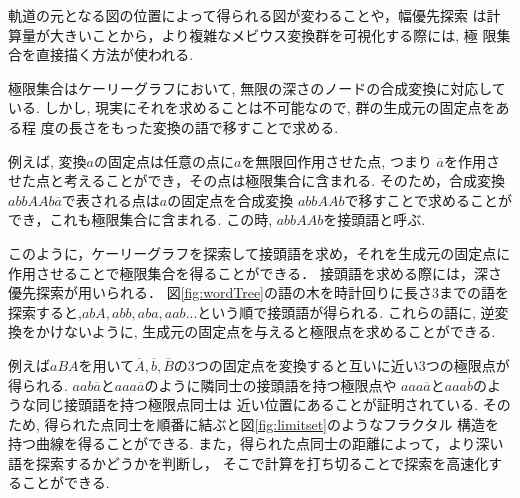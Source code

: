 軌道の元となる図の位置によって得られる図が変わることや，幅優先探索
は計算量が大きいことから，より複雑なメビウス変換群を可視化する際には, 極
限集合を直接描く方法が使われる.

極限集合はケーリーグラフにおいて, 無限の深さのノードの合成変換に対応している.
しかし, 現実にそれを求めることは不可能なので, 群の生成元の固定点をある程
度の長さをもった変換の語で移すことで求める.

例えば, 変換$a$の固定点は任意の点に$a$を無限回作用させた点, つまり
$\overline{a}$を作用させた点と考えることができ，その点は極限集合に含まれる.
そのため，合成変換$abbAAb\overline{a}$で表される点は$a$の固定点を合成変換
$abbAAb$で移すことで求めることができ，これも極限集合に含まれる.
この時, $abbAAb$を接頭語と呼ぶ.

このように，ケーリーグラフを探索して接頭語を求め，それを生成元の固定点に
作用させることで極限集合を得ることができる．
接頭語を求める際には，深さ優先探索が用いられる．
図\ref{fig:wordTree}の語の木を時計回りに長さ3までの語を探索すると,$ abA, abb, aba, aab ...$という順で接頭語が得られる.
これらの語に, 逆変換をかけないように, 生成元の固定点を与えると極限点を求めることができる.

例えば$aBA$を用いて$\overline{A}, \overline{b}, \overline{B}$の3つの固定点を変換すると互いに近い3つの極限点が得られる.
$aab\overline{a}$と$aaa\overline{a}$のように隣同士の接頭語を持つ極限点や
$aaa\overline{a}$と$aaa\overline{b}$のような同じ接頭語を持つ極限点同士は
近い位置にあることが証明されている.
そのため, 得られた点同士を順番に結ぶと図\ref{fig:limitset}のようなフラクタル
構造を持つ曲線を得ることができる.
また，得られた点同士の距離によって，より深い語を探索するかどうかを判断し，
そこで計算を打ち切ることで探索を高速化することができる.

